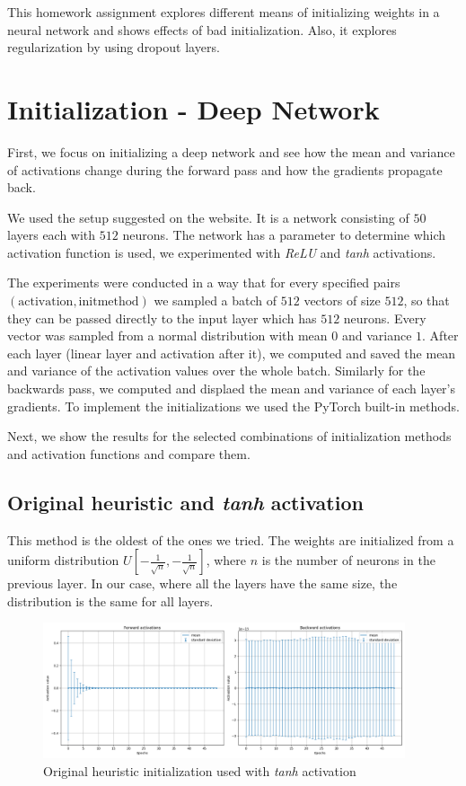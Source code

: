 \documentclass[a4paper,11pt]{article}
\begin{document}
This homework assignment explores different means of initializing weights in a neural network and shows effects of bad initialization.
Also, it explores regularization by using dropout layers.

\section{Initialization - Deep Network}
First, we focus on initializing a deep network and see how the mean and variance of activations change during the forward pass and how the gradients propagate back.

We used the setup suggested on the website.
It is a network consisting of $50$ layers each with $512$ neurons.
The network has a parameter to determine which activation function is used, we experimented with \textit{ReLU} and \textit{tanh} activations.

The experiments were conducted in a way that for every specified pairs $(\mathrm{activation}, \mathrm{init method})$ we sampled a batch of $512$ vectors of size $512$, so that they can be passed directly to the input layer which has $512$ neurons.
Every vector was sampled from a normal distribution with mean $0$ and variance $1$.
After each layer (linear layer and activation after it), we computed and saved the mean and variance of the activation values over the whole batch.
Similarly for the backwards pass, we computed and displaed the mean and variance of each layer's gradients.
To implement the initializations we used the PyTorch built-in methods.

Next, we show the results for the selected combinations of initialization methods and activation functions and compare them.

\subsection{Original heuristic and \textit{tanh} activation}
This method is the oldest of the ones we tried.
The weights are initialized from a uniform distribution $U\left[-\frac{1}{\sqrt{n}}, -\frac{1}{\sqrt{n}}\right]$, where $n$ is the number of neurons in the previous layer.
In our case, where all the layers have the same size, the distribution is the same for all layers.

\begin{figure}[ht]
    \centering
    \includegraphics[width=0.95\textwidth]{../out/01_deep/tanh_original.png}
    \caption{Original heuristic initialization used with \textit{tanh} activation}
    \label{fig:orig_tanh}
\end{figure}
\end{document}
